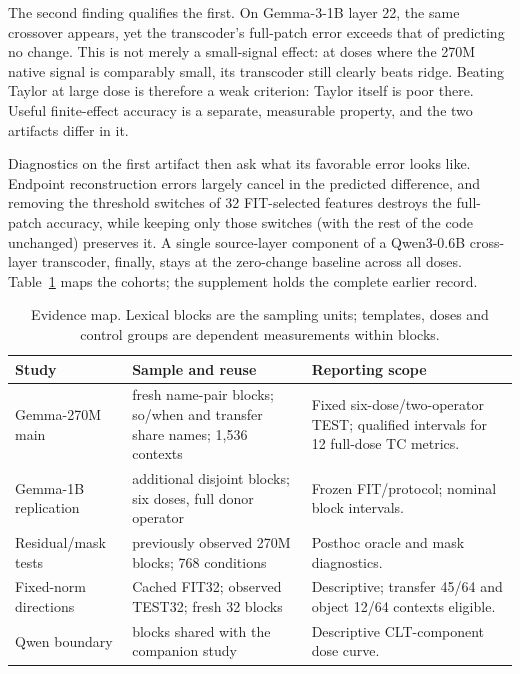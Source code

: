 \documentclass[11pt]{article}
\begin{document}
The second finding qualifies the first. On Gemma-3-1B layer 22, the same crossover appears, yet the transcoder's full-patch error exceeds that of predicting no change. This is not merely a small-signal effect: at doses where the 270M native signal is comparably small, its transcoder still clearly beats ridge. Beating Taylor at large dose is therefore a weak criterion: Taylor itself is poor there. Useful finite-effect accuracy is a separate, measurable property, and the two artifacts differ in it.

Diagnostics on the first artifact then ask what its favorable error looks like. Endpoint reconstruction errors largely cancel in the predicted difference, and removing the threshold switches of 32 FIT-selected features destroys the full-patch accuracy, while keeping only those switches (with the rest of the code unchanged) preserves it. A single source-layer component of a Qwen3-0.6B cross-layer transcoder, finally, stays at the zero-change baseline across all doses. Table~\ref{tab:scope} maps the cohorts; the supplement holds the complete earlier record.

\begin{table}[ht]\centering\scriptsize
\setlength{\tabcolsep}{4pt}
\begin{tabular}{>{\raggedright\arraybackslash}p{}>{\raggedright\arraybackslash}p{}>{\raggedright\arraybackslash}p{}}\toprule
Study & Sample and reuse & Reporting scope\\\midrule
Gemma-270M main & 256 fresh name-pair blocks; so/when and transfer share names; 1,536 contexts & Fixed six-dose/two-operator TEST; qualified intervals for 12 full-dose TC metrics.\\[3pt]
Gemma-1B replication & 256 additional disjoint blocks; six doses, full donor operator & Frozen FIT/protocol; nominal block intervals.\\[3pt]
Residual/mask tests & 32 previously observed 270M blocks; 768 conditions & Posthoc oracle and mask diagnostics.\\[3pt]
Fixed-norm directions & Cached FIT32; observed TEST32; fresh 32 blocks & Descriptive; transfer 45/64 and object 12/64 contexts eligible.\\[3pt]
Qwen boundary & 256 blocks shared with the companion study & Descriptive CLT-component dose curve.\\\bottomrule
\end{tabular}
\caption{Evidence map. Lexical blocks are the sampling units; templates, doses and control groups are dependent measurements within blocks.}\label{tab:scope}
\end{table}
\end{document}
